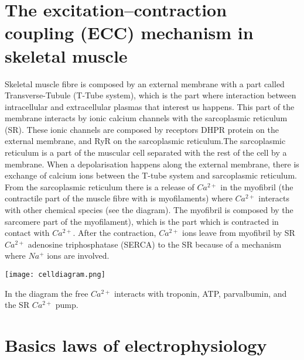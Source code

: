 \documentclass[a4paper,11pt]{report}
\begin{document}
\section{The excitation–contraction coupling (ECC) mechanism in skeletal muscle}
Skeletal muscle fibre is composed by an external membrane with a part called Transverse-Tubule (T-Tube system), which is the part where interaction between intracellular and extracellular plasmas that interest us happens. This part of the membrane interacts by ionic calcium channels with the sarcoplasmic reticulum (SR). These ionic channels are composed by receptors DHPR protein on the external membrane, and RyR on the sarcoplasmic reticulum.The sarcoplasmic reticulum is a part of the muscular cell separated with the rest of the cell by a membrane. When a depolarisation happens along the external membrane, there is exchange of calcium ions between the T-tube system and sarcoplasmic reticulum. From the sarcoplasmic reticulum there is a release of $Ca^{2+}$ in the myofibril (the contractile part of the muscle fibre with is myofilaments) where $Ca^{2+}$ interacts with other chemical species (see the diagram). The myofibril is composed by the sarcomere part of the myofilament), which is the part which is contracted in contact with $Ca^{2+}$. After the contraction, $Ca^{2+}$ ions leave from myofibril by SR$Ca^{2+}$ adenosine triphosphatase (SERCA) to the SR because of a mechanism where $Na^{+}$ ions are involved.   \cite{Calderon2014} \\


\begin{minipage}{0.55\linewidth}
\texttt{[image: celldiagram.png]} 
\label{fig1}
\end{minipage}\hfill
\begin{minipage}{0.4\linewidth}
In the diagram the free $Ca^{2+}$ interacts with troponin, ATP, parvalbumin, and the SR $Ca^{2+}$  pump.  \cite{Baylor2011} 
\end{minipage}




\section{Basics laws of electrophysiology}
\end{document}
